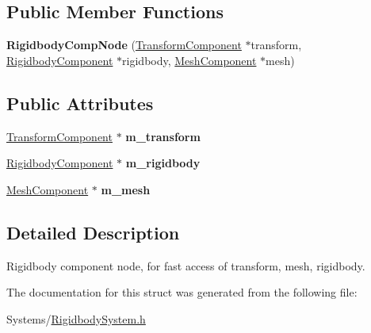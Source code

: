 \subsection*{Public Member Functions}
\begin{DoxyCompactItemize}
\item 
\mbox{\label{structRigidbodyCompNode_a51c74d2b0a39ca6c53d2072657c0c6ac}} 
{\bfseries Rigidbody\+Comp\+Node} (\hyperlink{classTransformComponent}{Transform\+Component} $\ast$transform, \hyperlink{classRigidbodyComponent}{Rigidbody\+Component} $\ast$rigidbody, \hyperlink{classMeshComponent}{Mesh\+Component} $\ast$mesh)
\end{DoxyCompactItemize}
\subsection*{Public Attributes}
\begin{DoxyCompactItemize}
\item 
\mbox{\label{structRigidbodyCompNode_a5539900346b002294494e49f47c5303f}} 
\hyperlink{classTransformComponent}{Transform\+Component} $\ast$ {\bfseries m\+\_\+transform}
\item 
\mbox{\label{structRigidbodyCompNode_a3b4bc2b5d79e293c7a9d55924b3c1ccb}} 
\hyperlink{classRigidbodyComponent}{Rigidbody\+Component} $\ast$ {\bfseries m\+\_\+rigidbody}
\item 
\mbox{\label{structRigidbodyCompNode_a55d5204d79d3ef4e83d442320258a1b8}} 
\hyperlink{classMeshComponent}{Mesh\+Component} $\ast$ {\bfseries m\+\_\+mesh}
\end{DoxyCompactItemize}


\subsection{Detailed Description}
Rigidbody component node, for fast access of transform, mesh, rigidbody. 

The documentation for this struct was generated from the following file\+:\begin{DoxyCompactItemize}
\item 
Systems/\hyperlink{RigidbodySystem_8h}{Rigidbody\+System.\+h}\end{DoxyCompactItemize}
